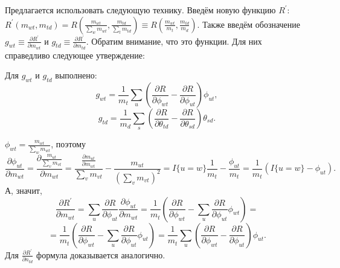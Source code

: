 \documentclass[12pt, twoside]{article}
\begin{document}
Предлагается использовать следующую технику. Введём новую функцию $R^{\prime}$: $R^{\prime}(m_{wt}, m_{td}) = R\left( \frac{m_{wt}}{\sum\limits_w m_{wt}},  \frac{m_{td}}{\sum\limits_t m_{td}}\right) \equiv R\left( \frac{m_{wt}}{m_t},  \frac{m_{td}}{m_d}\right)$. Также введём обозначение $g_{wt} \equiv \frac{\partial{R^{\prime}}}{\partial{m_{wt}}}$ и $g_{td} \equiv \frac{\partial{R^{\prime}}}{\partial{m_{td}}}$. Обратим внимание, что это функции. Для них справедливо следующее утверждение:
\begin{State}
\label{Stategradientvalue}           
Для $g_{wt}$ и $g_{td}$ выполнено:
\[
g_{wt} = \frac{1}{m_t} \sum_{u} \left(\frac{\partial{R}}{\partial{\phi_{wt}}}  -  \frac{\partial{R}}{\partial{\phi_{ut}}} \right)  \phi_{ut} ,
\]
\[
g_{td} = \frac{1}{m_d} \sum_{s} \left(\frac{\partial{R}}{\partial{\theta_{td}}}  -  \frac{\partial{R}}{\partial{\theta_{sd}}} \right)  \theta_{sd} .
\]
\end{State}
\begin{Proof}
$\phi_{wt} = \frac{m_{wt}}{\sum_w m_{wt}}$, поэтому
\[
\frac{\partial{\phi_{ut}}}{\partial{m_{wt}}} = \frac{\partial{ \frac{m_{ut}}{\sum\limits_v m_{vt}}}}{\partial{m_{wt}}} = \frac{ \frac{\partial{m_{ut}}}{\partial{m_{wt}}}}{\sum\limits_v m_{vt}} - \frac{m_{ut}}{(\sum\limits_v m_{vt})^2} = I\{u = w\} \frac{1}{m_t} - \frac{\phi_{ut}}{m_t} = \frac{1}{m_t}\left( 
 I\{u = w\} - \phi_{ut} \right).
\]
А, значит,
\[
\frac{\partial{R^{\prime}}}{\partial{m_{wt}}} = \sum_{u} \frac{\partial{R}}{\partial{\phi_{ut}}} \frac{\partial{\phi_{ut}}}{\partial{m_{wt}}} = \frac{1}{m_t} \left( \frac{\partial{R}}{\partial{\phi_{wt}}} - \sum_{u}  \frac{\partial{R}}{\partial{\phi_{ut}}} \phi_{wt} \right) = 
\]
\[
=\frac{1}{m_t} \left( \frac{\partial{R}}{\partial{\phi_{wt}}} - \sum_{u}  \frac{\partial{R}}{\partial{\phi_{ut}}} \phi_{ut} \right) = \frac{1}{m_t} \sum_{u} \left(\frac{\partial{R}}{\partial{\phi_{wt}}}  -  \frac{\partial{R}}{\partial{\phi_{ut}}} \right)  \phi_{ut}.
\]
Для $\frac{\partial{R^{\prime}}}{\partial{n_{td}}}$ формула доказывается аналогично.
\end{Proof}
\medskip
\end{document}
